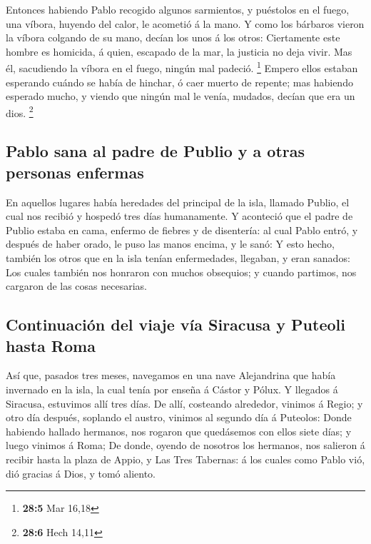  Entonces habiendo Pablo recogido algunos sarmientos, y
puéstolos en el fuego, una víbora, huyendo del calor, le acometió á la
mano.  Y como los bárbaros vieron la víbora colgando de su
mano, decían los unos á los otros: Ciertamente este hombre es homicida,
á quien, escapado de la mar, la justicia no deja vivir. 
Mas él, sacudiendo la víbora en el fuego, ningún mal padeció.
\footnote{\textbf{28:5} Mar 16,18}  Empero ellos estaban
esperando cuándo se había de hinchar, ó caer muerto de repente; mas
habiendo esperado mucho, y viendo que ningún mal le venía, mudados,
decían que era un dios. \footnote{\textbf{28:6} Hech 14,11}

\hypertarget{pablo-sana-al-padre-de-publio-y-a-otras-personas-enfermas}{%
\subsection{Pablo sana al padre de Publio y a otras personas
enfermas}\label{pablo-sana-al-padre-de-publio-y-a-otras-personas-enfermas}}

 En aquellos lugares había heredades del principal de la
isla, llamado Publio, el cual nos recibió y hospedó tres días
humanamente.  Y aconteció que el padre de Publio estaba en
cama, enfermo de fiebres y de disentería: al cual Pablo entró, y después
de haber orado, le puso las manos encima, y le sanó:  Y
esto hecho, también los otros que en la isla tenían enfermedades,
llegaban, y eran sanados:  Los cuales también nos
honraron con muchos obsequios; y cuando partimos, nos cargaron de las
cosas necesarias.

\hypertarget{continuaciuxf3n-del-viaje-vuxeda-siracusa-y-puteoli-hasta-roma}{%
\subsection{Continuación del viaje vía Siracusa y Puteoli hasta
Roma}\label{continuaciuxf3n-del-viaje-vuxeda-siracusa-y-puteoli-hasta-roma}}

 Así que, pasados tres meses, navegamos en una nave
Alejandrina que había invernado en la isla, la cual tenía por enseña á
Cástor y Pólux.  Y llegados á Siracusa, estuvimos allí
tres días.  De allí, costeando alrededor, vinimos á
Regio; y otro día después, soplando el austro, vinimos al segundo día á
Puteolos:  Donde habiendo hallado hermanos, nos rogaron
que quedásemos con ellos siete días; y luego vinimos á Roma;
 De donde, oyendo de nosotros los hermanos, nos salieron
á recibir hasta la plaza de Appio, y Las Tres Tabernas: á los cuales
como Pablo vió, dió gracias á Dios, y tomó aliento.


